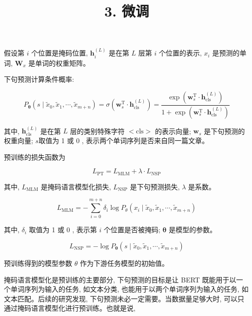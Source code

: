 \documentclass[10pt]{article}
\title{3. 微调 }
\author{}
\date{}
\begin{document}
\maketitle
假设第 $i$ 个位置是掩码位置, $\boldsymbol{h}_{i}^{(L)}$ 是在第 $L$ 层第 $i$ 个位置的表示, $x_{i}$ 是预测的单词, $\boldsymbol{W}_{x}$ 是单词的权重矩阵。

下句预测计算条件概率:


\begin{equation*}
P_{\boldsymbol{\theta}}\left(s \mid \tilde{x}_{0}, \tilde{x}_{1}, \cdots, \tilde{x}_{m+n}\right)=\sigma\left(\boldsymbol{w}_{s}^{\mathrm{T}} \cdot \boldsymbol{h}_{\mathrm{cls}}^{(L)}\right)=\frac{\exp \left(\boldsymbol{w}_{s}^{\mathrm{T}} \cdot \boldsymbol{h}_{\mathrm{cls}}^{(L)}\right)}{1+\exp \left(\boldsymbol{w}_{s}^{\mathrm{T}} \cdot \boldsymbol{h}_{\mathrm{cls}}^{(L)}\right)} \tag{27.26}
\end{equation*}


其中, $\boldsymbol{h}_{\mathrm{cls}}^{(L)}$ 是在第 $L$ 层的类别特殊字符 $<\mathrm{cls}>$ 的表示向量; $\boldsymbol{w}_{s}$ 是下句预测的权重向量; $s$取值为 1 或 0 , 表示两个单词序列是否来自同一篇文章。

预训练的损失函数为


\begin{equation*}
L_{\mathrm{PT}}=L_{\mathrm{MLM}}+\lambda \cdot L_{\mathrm{NSP}} \tag{27.27}
\end{equation*}


其中, $L_{\mathrm{MLM}}$ 是掩码语言模型化损失, $L_{\mathrm{NSP}}$ 是下句预测损失, $\lambda$ 是系数。


\begin{equation*}
L_{\mathrm{MLM}}=-\sum_{i=0}^{m+n} \delta_{i} \log P_{\theta}\left(x_{i} \mid \tilde{x}_{0}, \tilde{x}_{1}, \cdots, \tilde{x}_{m+n}\right) \tag{27.28}
\end{equation*}


其中, $\delta_{i}$ 取值为 1 或 0 , 表示第 $i$ 个位置是否被掩码; $\boldsymbol{\theta}$ 是模型的参数。


\begin{equation*}
L_{\mathrm{NSP}}=-\log P_{\boldsymbol{\theta}}\left(s \mid \tilde{x}_{0}, \tilde{x}_{1}, \cdots, \tilde{x}_{m+n}\right) \tag{27.29}
\end{equation*}


预训练得到的模型参数 $\theta$ 作为下游任务模型的初始值。

掩码语言模型化是预训练的主要部分, 下句预测的目标是让 BERT 既能用于以一个单词序列为输入的任务, 如文本分类, 也能用于以两个单词序列为输入的任务, 如文本匹配。后续的研究发现, 下句预测未必一定需要。当数据量足够大时, 可以只通过掩码语言模型化进行预训练。也就是说,
\end{document}
